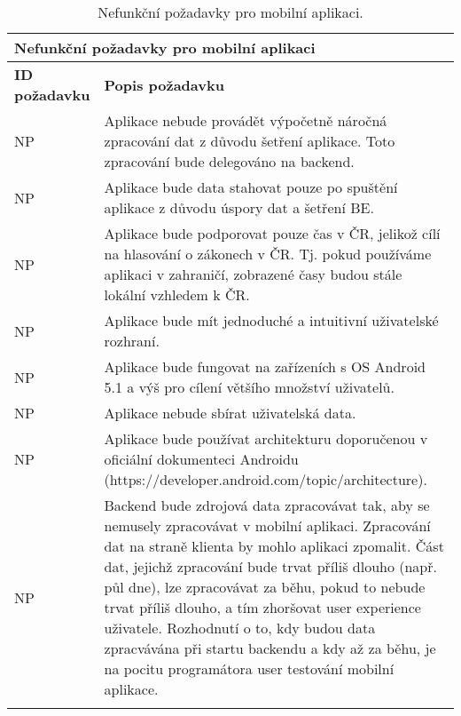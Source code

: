 \def\arraystretch{1.5}
\begin{longtable}{|l|p{9cm}|} \hline
	\multicolumn{2}{|l|}{\textbf{Nefunkční požadavky pro mobilní aplikaci}} \\ \hline
	\textbf{ID požadavku} & \textbf{Popis požadavku} \\ \hline
	
	NP\textunderscore 00	& Aplikace nebude provádět výpočetně náročná zpracování dat z důvodu šetření aplikace. Toto zpracování bude delegováno na backend. \\ \hline
	
	NP\textunderscore01	& Aplikace bude data stahovat pouze po spuštění aplikace z důvodu úspory dat a šetření BE. \\ \hline

	NP\textunderscore 02 & 
	Aplikace bude podporovat pouze čas v ČR, jelikož cílí na hlasování o zákonech v ČR. Tj. pokud používáme aplikaci v zahraničí, zobrazené časy budou stále lokální vzhledem k ČR. \\ \hline

	NP\textunderscore 03 & Aplikace bude mít jednoduché a intuitivní uživatelské rozhraní. \\ \hline
	
	NP\textunderscore 04 & Aplikace bude fungovat na zařízeních s OS Android 5.1 a výš pro cílení většího množství uživatelů. \\ \hline
	
	NP\textunderscore 05 & Aplikace nebude sbírat uživatelská data. \\ \hline
	
	NP\textunderscore 06 & Aplikace bude používat architekturu doporučenou v oficiální dokumenteci Androidu (https://developer.android.com/topic/architecture). \\ \hline
	
	NP\textunderscore07	& Backend bude zdrojová data zpracovávat tak, aby se nemusely zpracovávat v mobilní aplikaci. Zpracování dat na straně klienta by mohlo aplikaci zpomalit. Část dat, jejichž zpracování bude trvat příliš dlouho (např. půl dne), lze zpracovávat za běhu, pokud to nebude trvat příliš dlouho, a tím zhoršovat user experience uživatele. Rozhodnutí o to, kdy budou data zpracvávána při startu backendu a kdy až za běhu, je na pocitu programátora user testování mobilní aplikace. \\ \hline
	
	\caption{Nefunkční požadavky pro mobilní aplikaci.}
	\label{table:nonfunc_req_app}
\end{longtable}

